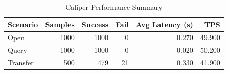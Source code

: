 \begin{table}
\caption{Caliper Performance Summary}
\label{tab:caliper_round}
\begin{tabular}{lrrrrr}
\toprule
Scenario & Samples & Success & Fail & Avg Latency (s) & TPS \\
\midrule
Open & 1000 & 1000 & 0 & 0.270 & 49.900 \\
Query & 1000 & 1000 & 0 & 0.020 & 50.200 \\
Transfer & 500 & 479 & 21 & 0.330 & 41.900 \\
\bottomrule
\end{tabular}
\end{table}
